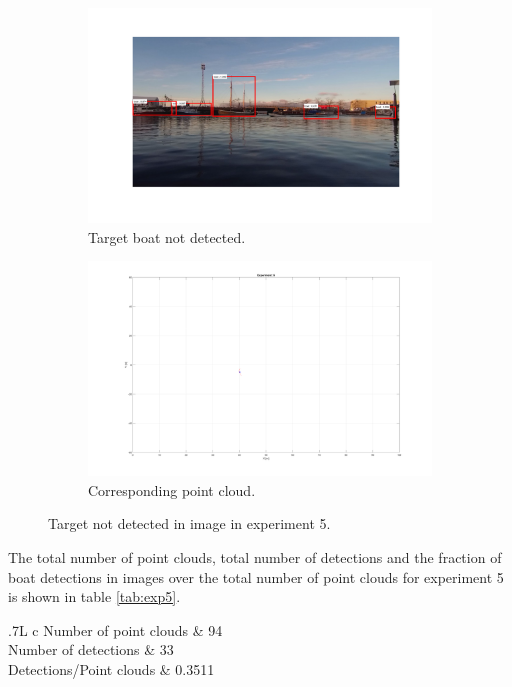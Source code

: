 \begin{figure}[H]
	\centering
	\begin{subfigure}[t]{.5\linewidth}
		\centering
		\includegraphics[width=\linewidth]{fig/ex5_miss.png}
		\caption{Target boat not detected.}
		\label{fig:sub_ex5_issue}
	\end{subfigure}%
	\begin{subfigure}[t]{.5\linewidth}
		\centering
		\includegraphics[width=\linewidth]{fig/ex5_miss_pc.png}
		\caption{Corresponding point cloud.}
		\label{fig:sub_ex5_issue2}
	\end{subfigure}
	\caption{Target not detected in image in experiment 5.}
	\label{fig:issues_ex5}
\end{figure}
The total number of point clouds, total number of detections and the fraction of boat detections in images over the total number of point clouds for experiment 5 is shown in table \ref{tab:exp5}.
\begin{table}[H]
	\centering
	\begin{tabularx}{.7\linewidth}{L c}
		\toprule
		Number of point clouds & 94\\
		\midrule
		Number of detections & 33\\
		\midrule
		Detections/Point clouds & 0.3511 \\
		\bottomrule
	\end{tabularx}
	\caption{Data from experiment 5.}
	\label{tab:exp5}
\end{table}

